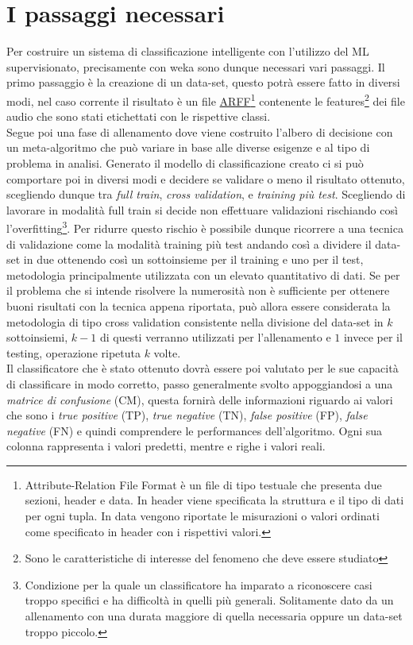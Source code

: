 \section{I passaggi necessari}
Per costruire un sistema di classificazione intelligente con l'utilizzo del ML supervisionato, precisamente con weka sono dunque necessari vari passaggi. Il primo passaggio è la creazione di un data-set, questo potrà essere fatto in diversi modi, nel caso corrente il risultato è un file \href{https://www.cs.waikato.ac.nz/ml/weka/arff.html}{ARFF}\footnote{Attribute-Relation File Format è un file di tipo testuale che presenta due sezioni, header e data. In header viene specificata la struttura e il tipo di dati per ogni tupla. In data vengono riportate le misurazioni o valori ordinati come specificato in header con i rispettivi valori.} contenente le features\footnote{Sono le caratteristiche di interesse del fenomeno che deve essere studiato} dei file audio che sono stati etichettati con le rispettive classi.\\
Segue poi una fase di allenamento dove viene costruito l'albero di decisione con un meta-algoritmo che può variare in base alle diverse esigenze e al tipo di problema in analisi. Generato il modello di classificazione creato ci si può comportare poi in diversi modi e decidere se validare o meno il risultato ottenuto, scegliendo dunque tra \emph{full train}, \emph{cross validation}\label{proc:cross-validation}, e \emph{training più test}. Scegliendo di lavorare in modalità full train si decide non effettuare validazioni rischiando così l'overfitting\footnote{Condizione per la quale un classificatore ha imparato a riconoscere casi troppo specifici e ha difficoltà in quelli più generali. Solitamente dato da un allenamento con una durata maggiore di quella necessaria oppure un data-set troppo piccolo.}. Per ridurre questo rischio è possibile dunque ricorrere a una tecnica di validazione come la modalità training più test andando così a dividere il data-set in due ottenendo così un sottoinsieme per il training e uno per il test, metodologia principalmente utilizzata con un elevato quantitativo di dati. Se per il problema che si intende risolvere la numerosità non è sufficiente per ottenere buoni risultati con la tecnica appena riportata, può allora essere considerata la metodologia di tipo cross validation consistente nella divisione del data-set in $k$ sottoinsiemi, $k-1$ di questi verranno utilizzati per l'allenamento e $1$ invece per il testing, operazione ripetuta $k$ volte.\\
Il classificatore che è stato ottenuto dovrà essere poi valutato per le sue capacità di classificare in modo corretto, passo generalmente svolto appoggiandosi a una \emph{matrice di confusione} (CM), questa fornirà delle informazioni riguardo ai valori che sono i \emph{true positive} (TP), \emph{true negative} (TN), \emph{false positive} (FP), \emph{false negative} (FN) e quindi comprendere le performances dell'algoritmo. Ogni sua colonna rappresenta i valori predetti, mentre e righe i valori reali.\\
